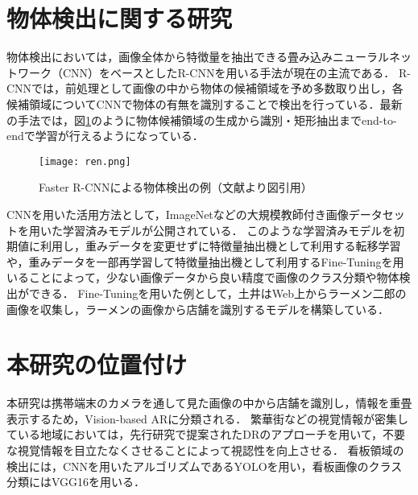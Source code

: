 \section{物体検出に関する研究}
  物体検出においては，画像全体から特徴量を抽出できる畳み込みニューラルネットワーク（CNN）\cite{Lecun:1998}をベースとしたR-CNN\cite{Girshick:2014}を用いる手法が現在の主流である\cite{Nakayama:2015}．
  R-CNNでは，前処理として画像の中から物体の候補領域を予め多数取り出し，各候補領域についてCNNで物体の有無を識別することで検出を行っている．最新の手法では，図\ref{figure:ren}のように物体候補領域の生成から識別・矩形抽出までend-to-endで学習が行えるようになっている\cite{Redmon:2017, Ren:2017}．
  \begin{figure}[tb]
    \centerline{\texttt{[image: ren.png]}}
    \caption{Faster R-CNNによる物体検出の例（文献\cite{Ren:2017}より図引用）}
    \label{figure:ren}
  \end{figure}

  CNNを用いた活用方法として，ImageNet\cite{Deng:2009}などの大規模教師付き画像データセットを用いた学習済みモデルが公開されている．
  このような学習済みモデルを初期値に利用し，重みデータを変更せずに特徴量抽出機として利用する転移学習\cite{Kamishima:2010}や，重みデータを一部再学習して特徴量抽出機として利用するFine-Tuning\cite{Nakayama:2015}を用いることによって，少ない画像データから良い精度で画像のクラス分類や物体検出ができる．
  Fine-Tuningを用いた例として，土井はWeb上からラーメン二郎の画像を収集し，ラーメンの画像から店舗を識別するモデルを構築している\cite{Doi:2018}．

\section{本研究の位置付け}
  本研究は携帯端末のカメラを通して見た画像の中から店舗を識別し，情報を重畳表示するため，Vision-based ARに分類される．
  繁華街などの視覚情報が密集している地域においては，先行研究\cite{Fujita:2013}で提案されたDRのアプローチを用いて，不要な視覚情報を目立たなくさせることによって視認性を向上させる．
  看板領域の検出には，CNNを用いたアルゴリズムであるYOLO\cite{Redmon:2017}を用い，看板画像のクラス分類にはVGG16\cite{Simonyan:2015}を用いる．